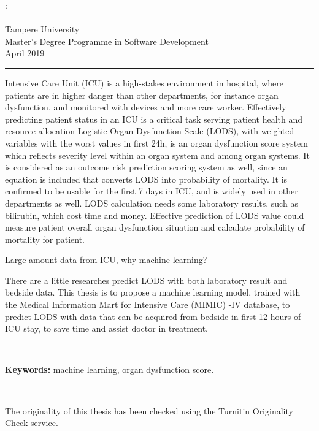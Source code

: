 \documentclass[12pt,a4paper,english
]{tunithesis}
\begin{document}
\begin{spacing}{1.0}
\noindent \@author: \@title\\
\@thesistype\\
Tampere University\\
Master’s Degree Programme in Software Development\\
April 2019
\end{spacing}
\noindent\rule{12cm}{0.4pt}

\vspace{0.5cm}


\noindent Intensive Care Unit (ICU) is a high-stakes environment in hospital, where patients are in higher danger than other departments, for instance organ dysfunction, and monitored with devices and more care worker. Effectively predicting patient status in an ICU is a critical task serving patient health and resource allocation Logistic Organ Dysfunction Scale (LODS), with weighted variables with the worst values in first 24h, is an organ dysfunction score system which reflects severity level within an organ system and among organ systems. It is considered as an outcome risk prediction scoring system as well, since an equation is included that converts LODS into probability of mortality. It is confirmed to be usable for the first 7 days in ICU, and is widely used in other departments as well. LODS calculation needs some laboratory results, such as bilirubin, which cost time and money. Effective prediction of LODS value could measure patient overall organ dysfunction situation and calculate probability of mortality for patient.

\noindent Large amount data from ICU, why machine learning? 

\noindent There are a little researches predict LODS with both laboratory result and bedside data. This thesis is to propose a machine learning model, trained with the Medical Information Mart for Intensive Care (MIMIC) -IV database, to predict LODS with data that can be acquired from bedside in first 12 hours of ICU stay, to save time and assist doctor in treatment.




~

\noindent\textbf{Keywords:} machine learning, organ dysfunction score.

~

\noindent The originality of this thesis has been checked using the Turnitin Originality Check service.
\end{document}

